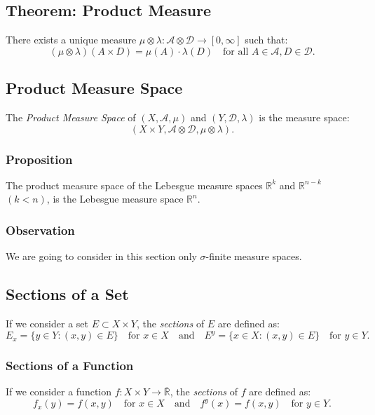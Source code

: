 \documentclass[11pt]{article}
\begin{document}
\subsection{Theorem: Product Measure}
There exists a unique measure \(\mu \otimes \lambda : \mathcal{A} \otimes \mathcal{D} \to [0, \infty]\) such that:
\[(\mu \otimes \lambda)(A \times D) = \mu(A) \cdot \lambda(D) \quad \text{for all } A \in \mathcal{A}, D \in \mathcal{D}.\]

\subsection{Product Measure Space}
The \textit{Product Measure Space} of \((X, \mathcal{A}, \mu)\) and \((Y, \mathcal{D}, \lambda)\) is the measure space:
\[(X \times Y, \mathcal{A} \otimes \mathcal{D}, \mu \otimes \lambda).\]

\subsubsection{Proposition}
The product measure space of the Lebesgue measure spaces \(\mathbb{R}^k\) and \(\mathbb{R}^{n-k}\) \((k < n)\), is the Lebesgue measure space \(\mathbb{R}^n\).

\subsubsection*{Observation}
We are going to consider in this section only \(\sigma\)-finite measure spaces.

\subsection{Sections of a Set}
If we consider a set \(E \subset X \times Y\), the \textit{sections} of \(E\) are defined as:
\[E_x = \{y \in Y : (x, y) \in E\} \quad \text{for } x \in X \quad \text{and} \quad E^y = \{x \in X : (x, y) \in E\} \quad \text{for } y \in Y.\]

\subsubsection{Sections of a Function}
If we consider a function \(f: X \times Y \to \overline{\mathbb{R}}\), the \textit{sections} of \(f\) are defined as:
\[f_x(y) = f(x, y) \quad \text{for } x \in X \quad \text{and} \quad f^y(x) = f(x, y) \quad \text{for } y \in Y.\]
\end{document}
